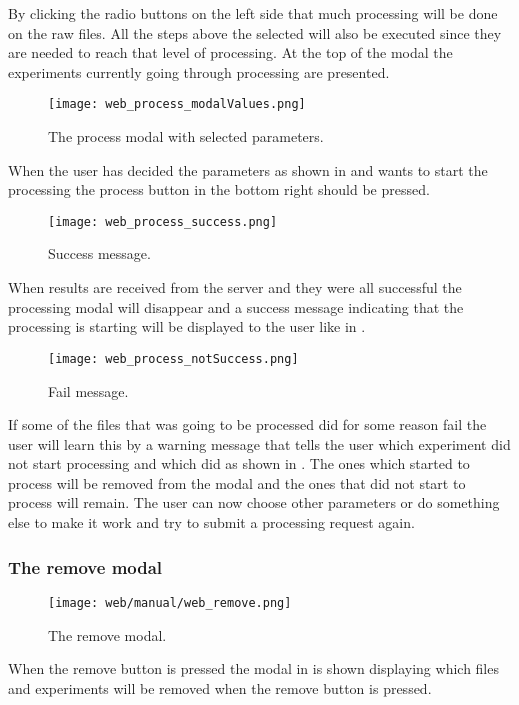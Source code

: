 By clicking the radio buttons on the left side that much processing will be done on the raw files. All the steps above the selected will also be executed since they are needed to reach that level of processing.
At the top of the modal the experiments currently going through processing are presented.
\begin{figure}[h]
\centering
\texttt{[image: web\_process\_modalValues.png]}
\caption{\label{fig:web_process_modalValues}The process modal with selected parameters.}
\end{figure}
\FloatBarrier
When the user has decided the parameters as shown in  and wants to start the processing the process button in the bottom right should be pressed. 
\begin{figure}[h]
\centering
\texttt{[image: web\_process\_success.png]}
\caption{\label{fig:web_process_success}Success message.}
\end{figure}
\FloatBarrier
When results are received from the server and they were all successful the processing modal will disappear and a success message indicating that the processing is starting will be displayed to the user like in .
\begin{figure}[h]
\centering
\texttt{[image: web\_process\_notSuccess.png]}
\caption{\label{fig:web_process_notSuccess}Fail message.}
\end{figure}
If some of the files that was going to be processed did for some reason fail the user will learn this by a warning message that tells the user which experiment did not start processing and which did as shown in . The ones which started to process will be removed from the modal and the ones that did not start to process will remain. The user can now choose other parameters or do something else to make it work and try to submit a processing request again.
\pagebreak
\subsubsection{The remove modal}
\begin{figure}[h]
\centering
\texttt{[image: web/manual/web\_remove.png]}
\caption{\label{fig:web_remove_removeFiles}The remove modal.}
\end{figure}
\FloatBarrier
When the remove button is pressed the modal in  is shown displaying which files and experiments will be removed when the remove button is pressed.

